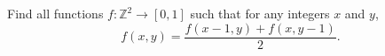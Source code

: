 Find all functions $f: \mathbb{Z}^2 \to [0, 1]$ such that for any integers $x$ and $y$,
\[f(x, y) = \frac{f(x - 1, y) + f(x, y - 1)}{2}.\]